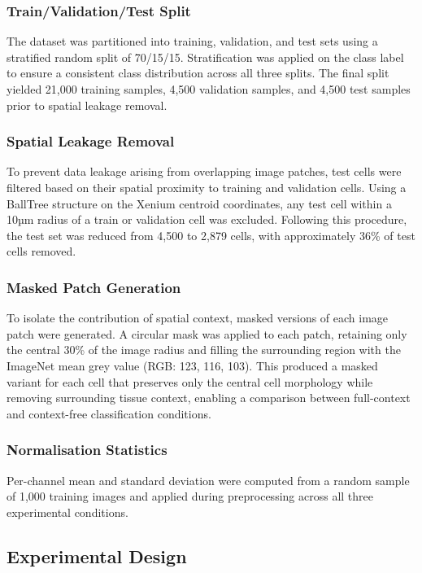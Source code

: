 \documentclass[11pt,a4paper]{article}
\begin{document}
\subsubsection{Train/Validation/Test Split}

The dataset was partitioned into training, validation, and test sets using a stratified random split of 70/15/15. Stratification was applied on the class label to ensure a consistent class distribution across all three splits. The final split yielded 21,000 training samples, 4,500 validation samples, and 4,500 test samples prior to spatial leakage removal.

\subsubsection{Spatial Leakage Removal}

To prevent data leakage arising from overlapping image patches, test cells were filtered based on their spatial proximity to training and validation cells. Using a BallTree structure on the Xenium centroid coordinates, any test cell within a 10µm radius of a train or validation cell was excluded. Following this procedure, the test set was reduced from 4,500 to 2,879 cells, with approximately 36\% of test cells removed.

\subsubsection{Masked Patch Generation}

To isolate the contribution of spatial context, masked versions of each image patch were generated. A circular mask was applied to each patch, retaining only the central 30\% of the image radius and filling the surrounding region with the ImageNet mean grey value (RGB: 123, 116, 103). This produced a masked variant for each cell that preserves only the central cell morphology while removing surrounding tissue context, enabling a comparison between full-context and context-free classification conditions.

\subsubsection{Normalisation Statistics}

Per-channel mean and standard deviation were computed from a random sample of 1,000 training images and applied during preprocessing across all three experimental conditions.

\subsection{Experimental Design}
\end{document}
